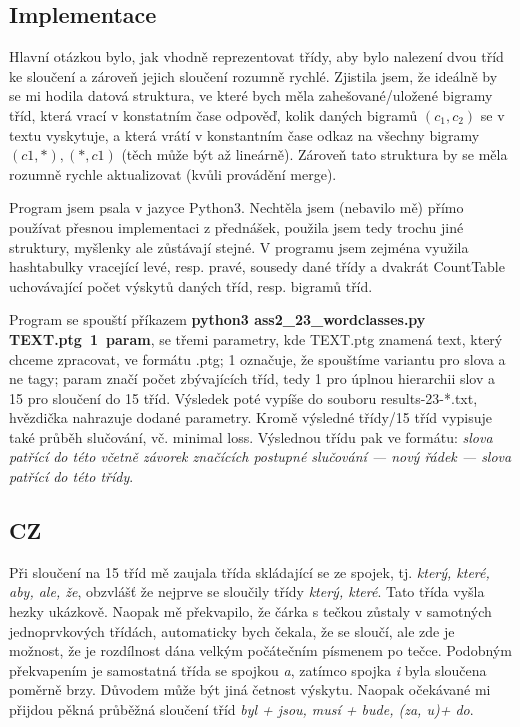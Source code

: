 \documentclass[12pt, a4paper]{report}
\theoremstyle{remark}
\begin{document}
\subsection*{Implementace}
Hlavní otázkou bylo, jak vhodně reprezentovat třídy, aby bylo nalezení dvou tříd ke sloučení a zároveň jejich sloučení rozumně rychlé. Zjistila jsem, že ideálně by se mi hodila datová struktura, ve které bych měla zahešované/uložené bigramy tříd, která vrací v konstatním čase odpověď, kolik daných bigramů $(c_1,c_2)$ se v textu vyskytuje, a která vrátí v konstantním čase odkaz na všechny bigramy $(c1,*),(*,c1)$ (těch může být až lineárně). Zároveň tato struktura by se měla rozumně rychle aktualizovat (kvůli provádění merge).

Program jsem psala v jazyce Python3. Nechtěla jsem (nebavilo mě) přímo používat přesnou implementaci z přednášek, použila jsem tedy trochu jiné struktury, myšlenky ale zůstávají stejné. V programu jsem zejména využila hashtabulky vracející levé, resp. pravé, sousedy dané třídy a dvakrát CountTable uchovávající počet výskytů daných tříd, resp. bigramů tříd.  

Program se spouští příkazem {\bf python3 ass2\_23\_wordclasses.py TEXT.ptg~1~param}, se třemi parametry, kde TEXT.ptg znamená text, který chceme zpracovat, ve formátu .ptg; 1 označuje, že spouštíme variantu pro slova a ne tagy; param značí počet zbývajících tříd, tedy 1 pro úplnou hierarchii slov a 15 pro sloučení do 15 tříd. 
Výsledek poté vypíše do souboru results-23-*.txt, hvězdička nahrazuje dodané parametry. Kromě výsledné třídy/15 tříd vypisuje také průběh slučování, vč. minimal loss. Výslednou třídu pak ve formátu: {\it slova patřící do této včetně závorek značících postupné slučování --- nový řádek --- slova patřící do této třídy}.

\subsection*{CZ}
Při sloučení na 15 tříd mě zaujala třída skládající se ze spojek, tj. {\it  který, které, aby, ale, že}, obzvlášť že nejprve se sloučily třídy {\it který, které}. Tato třída vyšla hezky ukázkově. Naopak mě překvapilo, že čárka s tečkou zůstaly v samotných jednoprvkových třídách, automaticky bych čekala, že se sloučí, ale zde je možnost, že je rozdílnost dána velkým počátečním písmenem po tečce. Podobným překvapením je samostatná třída se spojkou {\it a}, zatímco spojka {\it i} byla sloučena poměrně brzy. Důvodem může být jiná četnost výskytu. Naopak očekávané mi přijdou pěkná průběžná sloučení tříd {\it byl + jsou, musí + bude, (za, u)+ do}.
\end{document}
